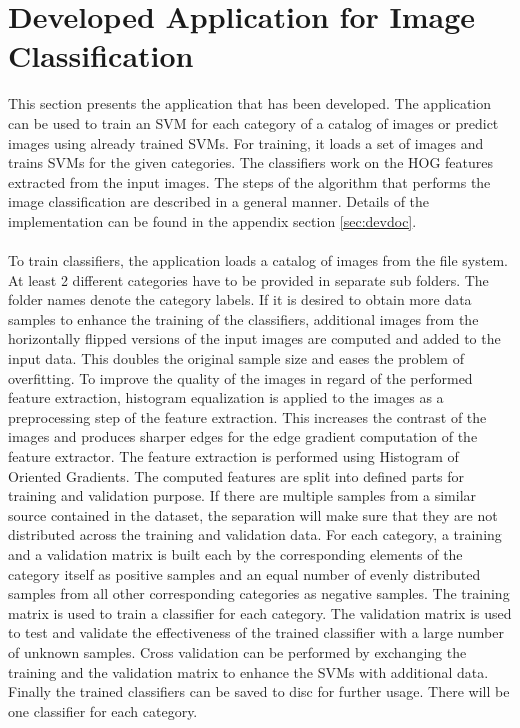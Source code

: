 
\section{Developed Application for Image Classification}\label{sec:application}

This section presents the application that has been developed. The application can be used to train an SVM for each category of a catalog of images or predict images using already trained SVMs. For training, it loads a set of images and trains SVMs for the given categories. The classifiers work on the HOG features extracted from the input images. The steps of the algorithm that performs the image classification are described in a general manner. Details of the implementation can be found in the appendix section \ref{sec:devdoc}.
\\
\\
To train classifiers, the application loads a catalog of images from the file system. At least 2 different categories have to be provided in separate sub folders. The folder names denote the category labels. If it is desired to obtain more data samples to enhance the training of the classifiers, additional images from the horizontally flipped versions of the input images are computed and added to the input data. This doubles the original sample size and eases the problem of overfitting. To improve the quality of the images in regard of the performed feature extraction, histogram equalization is applied to the images as a preprocessing step of the feature extraction. This increases the contrast of the images and produces sharper edges for the edge gradient computation of the feature extractor. The feature extraction is performed using Histogram of Oriented Gradients. The computed features are split into defined parts for training and validation purpose. If there are multiple samples from a similar source contained in the dataset, the separation will make sure that they are not distributed across the training and validation data. For each category, a training and a validation matrix is built each by the corresponding elements of the category itself as positive samples and an equal number of evenly distributed samples from all other corresponding categories as negative samples. The training matrix is used to train a classifier for each category. The validation matrix is used to test and validate the effectiveness of the trained classifier with a large number of unknown samples. Cross validation can be performed by exchanging the training and the validation matrix to enhance the SVMs with additional data. Finally the trained classifiers can be saved to disc for further usage. There will be one classifier for each category.
